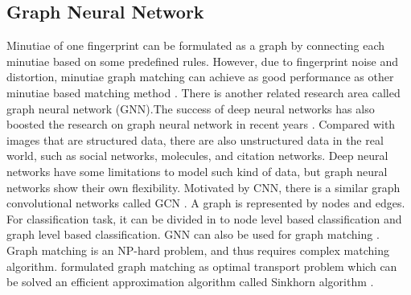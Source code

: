 \subsection{Graph Neural Network}
Minutiae of one fingerprint can be formulated as a graph by connecting each minutiae based on some predefined rules. However, due to fingerprint noise and distortion, minutiae graph matching can achieve as good performance as other minutiae based matching method \cite{ChikkerurICB2006}. There is another related research area called graph neural network (GNN).The success of deep neural networks has also boosted the research on graph neural network  in recent years \cite{WuTNNLS2020} \cite{ZhouAI2020} \cite{XuICLR2019GIN}. Compared with images that are structured data, there are also unstructured data in the real world, such as social networks, molecules, and citation networks. Deep neural networks have some limitations to model such kind of data, but graph neural networks show their own flexibility. Motivated by CNN, there is a similar graph convolutional networks called GCN \cite{KipfICLR2017}. A graph is represented by nodes and edges. For classification task, it can be divided in to node level based classification and graph level based classification. GNN can also be used for graph matching \cite{ZanfirCVPR2018} \cite{LiICML2019}. Graph matching is an NP-hard problem, and thus requires complex matching algorithm. \cite{SarlinCVPR2020superglue} formulated graph matching as optimal transport problem which can be solved an efficient approximation algorithm called Sinkhorn algorithm \cite{CuturiNIPS2013sinkhorn}.